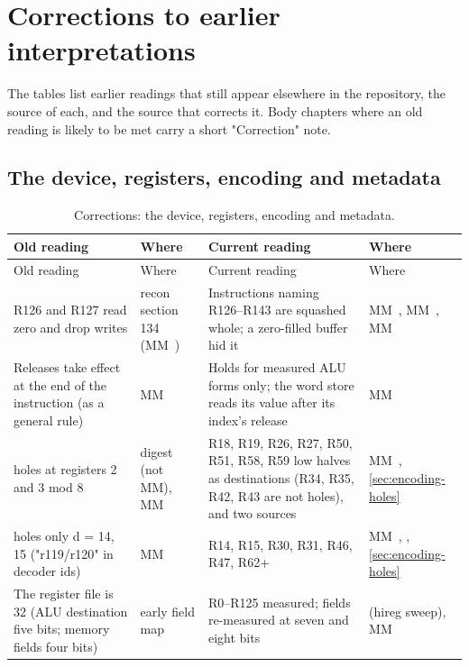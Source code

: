 \chapter{Corrections to earlier interpretations}\label{app:a}

The tables list earlier readings that still appear elsewhere in the repository, the source of each, and the source
that corrects it. Body chapters where an old reading is likely to be met carry a short "Correction" note.

\section{The device, registers, encoding and metadata}\label{sec:device-registers-encoding-2}

\begin{xltabular}{\linewidth}{@{}>{\hsize}X>{\hsize}X>{\hsize}X>{\hsize}X@{}}
\caption{Corrections: the device, registers, encoding and metadata.}\label{tab:corr-device-encoding}\\
\toprule
Old reading & Where & Current reading & Where \\
\midrule
\endfirsthead
{}
\toprule
Old reading & Where & Current reading & Where \\
\midrule
\endhead
R126 and R127 read zero and drop writes & recon section 134 (MM~) & Instructions naming R126–R143 are squashed whole; a zero-filled buffer
hid it & MM~, MM~, MM~ \\
Releases take effect at the end of the instruction (as a general rule) & MM~ & Holds for measured ALU forms only; the word store reads its value after its
index's release & MM~ \\
 holes at registers 2 and 3 mod 8 & digest (not MM), MM~ & R18, R19, R26, R27, R50, R51, R58, R59 low halves as destinations (R34, R35, R42, R43 are not holes), and two sources & MM~, \cref{sec:encoding-holes} \\
 holes only d = 14, 15 ("r119/r120" in decoder ids) & MM~ & R14, R15, R30, R31, R46, R47, R62+ & MM~, , \cref{sec:encoding-holes} \\
The register file is 32 (ALU destination five bits; memory fields four
bits) & early  field map & R0–R125 measured; fields re-measured at seven and eight bits &  (hireg sweep), MM~ \\

\end{xltabular}
